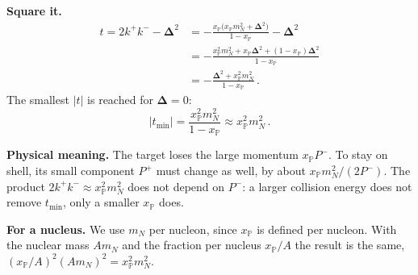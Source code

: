 \documentclass[12pt]{article}
\begin{document}
\textbf{Square it.}
\begin{align}
  t=2k^+k^--\boldsymbol\Delta^2
   &=-\frac{x_{\mathbb P}\big(x_{\mathbb P}m_N^2+\boldsymbol\Delta^2\big)}{1-x_{\mathbb P}}-\boldsymbol\Delta^2\nonumber\\
   &=-\frac{x_{\mathbb P}^2m_N^2+x_{\mathbb P}\boldsymbol\Delta^2+(1-x_{\mathbb P})\boldsymbol\Delta^2}{1-x_{\mathbb P}}\nonumber\\
   &=-\frac{\boldsymbol\Delta^2+x_{\mathbb P}^2m_N^2}{1-x_{\mathbb P}}\,.
\end{align}
The smallest $|t|$ is reached for $\boldsymbol\Delta=0$:
\begin{equation}
  |t_{\min}|=\frac{x_{\mathbb P}^2m_N^2}{1-x_{\mathbb P}}\approx x_{\mathbb P}^2m_N^2\,.
\end{equation}

\textbf{Physical meaning.} The target loses the large momentum $x_{\mathbb P}P^-$. To stay on
shell, its small component $P^+$ must change as well, by about $x_{\mathbb P}m_N^2/(2P^-)$. The
product $2k^+k^-\approx x_{\mathbb P}^2m_N^2$ does not depend on $P^-$: a larger collision energy
does not remove $t_{\min}$, only a smaller $x_{\mathbb P}$ does.

\textbf{For a nucleus.} We use $m_N$ per nucleon, since $x_{\mathbb P}$ is defined per nucleon.
With the nuclear mass $Am_N$ and the fraction per nucleus $x_{\mathbb P}/A$ the result is the same,
$(x_{\mathbb P}/A)^2(Am_N)^2=x_{\mathbb P}^2m_N^2$.
\end{document}
